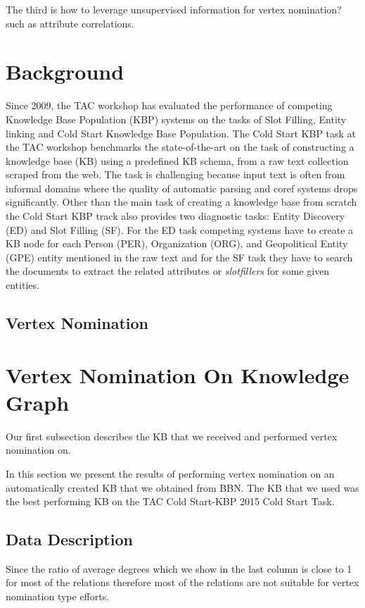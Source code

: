 \documentclass[paper=a4,fontsize=11pt]{scrartcl}
\numberwithin{equation}{section}    %
\numberwithin{figure}{section}      %
\numberwithin{table}{section}       %
\begin{document}
The third is how to leverage unsupervised information for vertex nomination?
such as attribute correlations.


\section{Background}
\label{sec:background}

Since 2009, the TAC workshop has evaluated the performance of
competing Knowledge Base Population (KBP) systems on the tasks of Slot Filling,
Entity linking and Cold Start Knowledge Base Population.
The Cold Start KBP task at the TAC workshop benchmarks the state-of-the-art
on the task of constructing a knowledge base (KB) using a predefined KB schema, 
from a raw text collection scraped from the web. 
The task is challenging because input text is often from informal domains
where the quality of automatic parsing and coref systems drops significantly.
Other than the main task of creating a knowledge base from scratch
the Cold Start KBP track also provides two
diagnostic tasks: Entity Discovery (ED) and Slot Filling (SF).
For the ED task competing systems have to create a KB node for each Person
(PER), Organization (ORG), and Geopolitical Entity (GPE) entity mentioned
in the raw text and for the SF task they have to search the documents to
extract the related attributes or \textit{slotfillers} for some given entities.


\subsection{Vertex Nomination}
\label{sec:vertex-nomination}


\section{Vertex Nomination On Knowledge Graph}
\label{sec:vert-nomin-knowl}
Our first subsection describes the KB that we received and performed 
vertex nomination on.

In this section we present the results of performing vertex nomination on
an automatically created KB that we obtained from BBN. The KB that we used
was the best performing KB on the TAC Cold Start-KBP 2015 Cold Start Task.

\subsection{Data Description}
\label{sec:data-description}
Since the ratio of average degrees which we show in the last column is close to 1
for most of the relations therefore most of the relations are not suitable for
vertex nomination type efforts.
\end{document}
